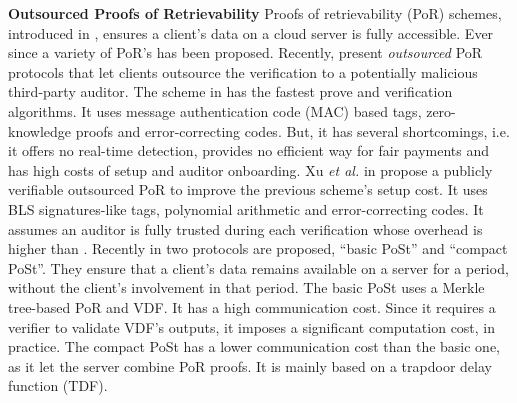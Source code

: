 

\noindent\textbf{Outsourced Proofs of Retrievability}
Proofs of retrievability (PoR) schemes, introduced in \cite{DBLP:conf/ccs/JuelsK07},  ensures  a client's data on a cloud server is fully accessible. Ever since  a variety of PoR's has been proposed.  Recently,  \cite{armknecht2014outsourced,xu2016lightweight} present  \emph{outsourced} PoR protocols that let  clients outsource the   verification to a potentially malicious third-party auditor. The scheme in \cite{armknecht2014outsourced}   has the fastest prove and verification algorithms. It uses message authentication code (MAC) based tags, zero-knowledge proofs and error-correcting codes. But, it  has  several shortcomings, i.e. it offers no real-time detection,  provides no efficient way for fair payments and  has high costs of setup and auditor onboarding.   Xu \textit{et al.} in \cite{xu2016lightweight} propose a publicly verifiable outsourced PoR to improve the previous scheme's setup cost. It uses   BLS signatures-like tags, polynomial arithmetic and error-correcting codes.  It assumes an auditor is fully trusted during each verification whose overhead is higher  than \cite{armknecht2014outsourced}. Recently in \cite{Storage-Time} two protocols are proposed, ``basic PoSt'' and ``compact PoSt''. They ensure that a client's data remains available on a   server for a   period, without the client's involvement  in that period.  The basic PoSt  uses a Merkle tree-based PoR and VDF. It has a high communication cost. Since it  requires a verifier to validate VDF's outputs, it imposes a significant computation cost, in practice. The compact PoSt has a lower communication cost than the basic one, as it let the server combine PoR proofs. It is mainly based on a trapdoor delay function (TDF). 



